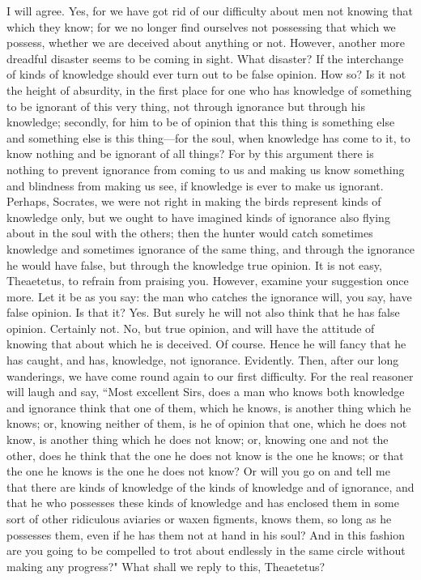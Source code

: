 \documentclass[letterpaper,12pt]{article}
\newcommand{\stephpag}[1]{\marginnote{\small\itshape\fontfamily{ppl}\selectfont #1}}
\begin{document}
\begin{drama}
\theaetetusspeaks
I will agree.
\socratesspeaks
Yes, for we have got rid of our difficulty about men not knowing that which they know; for we no longer find ourselves not possessing that which we possess, whether we are deceived about anything or not. However, another more dreadful disaster seems to be coming in sight.
\theaetetusspeaks
What disaster?
\socratesspeaks
If the interchange of kinds of knowledge should ever turn out to be false opinion.
\theaetetusspeaks
How so? \stephpag{d}
\socratesspeaks
Is it not the height of absurdity, in the first place for one who has knowledge of something to be ignorant of this very thing, not through ignorance but through his knowledge; secondly, for him to be of opinion that this thing is something else and something else is this thing—for the soul, when knowledge has come to it, to know nothing and be ignorant of all things? For by this argument there is nothing to prevent ignorance from coming to us and making us know something and blindness from making us see, if knowledge is ever to make us ignorant. \stephpag{e}
\theaetetusspeaks
Perhaps, Socrates, we were not right in making the birds represent kinds of knowledge only, but we ought to have imagined kinds of ignorance also flying about in the soul with the others; then the hunter would catch sometimes knowledge and sometimes ignorance of the same thing, and through the ignorance he would have false, but through the knowledge true opinion.
\socratesspeaks
It is not easy, Theaetetus, to refrain from praising you. However, examine your suggestion once more. Let it be as you say: \stephpag{200 a} the man who catches the ignorance will, you say, have false opinion. Is that it?
\theaetetusspeaks
Yes.
\socratesspeaks
But surely he will not also think that he has false opinion.
\theaetetusspeaks
Certainly not.
\socratesspeaks
No, but true opinion, and will have the attitude of knowing that about which he is deceived.
\theaetetusspeaks
Of course.
\socratesspeaks
Hence he will fancy that he has caught, and has, knowledge, not ignorance.
\theaetetusspeaks
Evidently.
\socratesspeaks
Then, after our long wanderings, we have come round again to our first difficulty. For the real reasoner \stephpag{b} will laugh and say, ``Most excellent Sirs, does a man who knows both knowledge and ignorance think that one of them, which he knows, is another thing which he knows; or, knowing neither of them, is he of opinion that one, which he does not know, is another thing which he does not know; or, knowing one and not the other, does he think that the one he does not know is the one he knows; or that the one he knows is the one he does not know? Or will you go on and tell me that there are kinds of knowledge of the kinds of knowledge and of ignorance, and that he who possesses these kinds of knowledge and has enclosed them in some sort of other ridiculous aviaries \stephpag{c} or waxen figments, knows them, so long as he possesses them, even if he has them not at hand in his soul? And in this fashion are you going to be compelled to trot about endlessly in the same circle without making any progress?" What shall we reply to this, Theaetetus?

\end{drama}
\end{document}
